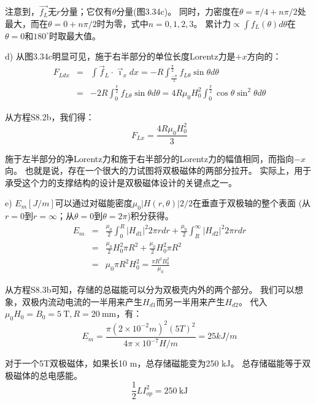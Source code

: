 注意到，$\vec{f_L}$无$r$分量；它仅有$\theta$分量(图3.34c)。
同时，力密度在$\theta=\pi/4+n\pi/2$处最大，而在$\theta=0+n\pi/2$时为零，式中$n=0, 1, 2, 3$。
累计力$\propto\int f_L(\theta)d\theta$在$\theta=0$和$180^\circ$时取最大值。

d) 从图3.34c明显可见，施于右半部分的单位长度Lorentz力是$+x$方向的：
\begin{eqnarray}
F_{Ldx}&=&\int\vec{f}_{L}\cdot\vec{\imath}_{x}dx=-R\int_{\frac{-\pi}{2}}^{\frac{\pi}{2}}f_{L\theta}\sin\theta d\theta\\%
&=&-2R\int_{0}^{\frac{\pi}{2}}f_{L\theta}\sin\theta d\theta=4R\mu_{0}H_{0}^{2}\int_{0}^{\frac{\pi}{2}}\cos\theta \sin^{2}\theta d\theta%
\end{eqnarray}

从方程S8.2b，我们得：
\begin{equation}
F_{Lx}=\frac{4R\mu_{0}H_{0}^{2}}{3}%
\end{equation}

施于左半部分的净Lorentz力和施于右半部分的Lorentz力的幅值相同，而指向$-x$向。
也就是说，存在一个很大的力试图将双极磁体的两部分拉开。
实际上，用于承受这个力的支撑结构的设计是双极磁体设计的关键点之一。

e) $E_m [J/m]$可以通过对磁能密度$\mu_0|H(r,\theta)|2/2$在垂直于双极轴的整个表面
(从$r=0$到$r=\infty$；从$\theta=0$到$\theta=2\pi$)积分获得。
\begin{eqnarray}
E_{m}&=&\frac{\mu_{0}}{2}\int_{0}^{R}|H_{d1}|^{2}2\pi rdr+\frac{\mu_{0}}{2}\int_{R}^{\infty}|H_{d2}|^{2}2\pi rdr\\%
&=&\frac{\mu_{0}}{2}H_{0}^{2}\pi R^{2}+\frac{\mu_{0}}{2}H_{0}^{2}\pi R^{2}\\%
&=&\mu_{0}\pi R^{2}H_{0}^{2}=\frac{\pi R^{2}B_{0}^{2}}{\mu_{0}}%
\end{eqnarray}

从方程S8.3b可知，存储的总磁能可以分为双极壳内外的两个部分。
我们可以想象，双极内流动电流的一半用来产生$H_{d1}$而另一半用来产生$H_{d2}$。
代入$\mu_0 H_0=B_0=5\ \mathrm{T},R=20\ \mathrm{mm}$，有：
\begin{equation*}
E_{m}=\frac{\pi(2\times 10^{-2}m)^{2}(5T)^{2}}{4\pi\times10^{-7}H/m}=25kJ/m
\end{equation*}

对于一个5T双极磁体，如果长10 m，总存储磁能变为250 kJ。
总存储磁能等于双极磁体的总电感能。
\begin{equation}
\frac{1}{2}LI_{op}^{2}=250\ \mathrm{kJ}%
\end{equation}

